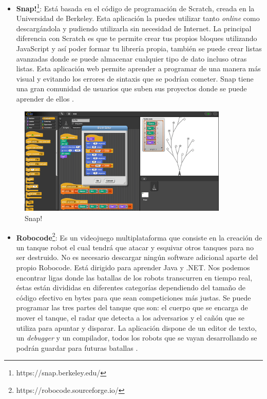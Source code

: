 \begin{itemize}
\item \textbf{Snap!}\footnote{https://snap.berkeley.edu/}: Está basada en el código de programación de Scratch, creada en la Universidad de Berkeley. Esta aplicación la puedes utilizar tanto \textit{online} como descargándola y pudiendo utilizarla sin necesidad de Internet. La principal diferencia con Scratch es que te permite crear tus propios bloques utilizando JavaScript y así poder formar tu librería propia, también se puede crear listas avanzadas donde se puede almacenar cualquier tipo de dato incluso otras listas.  Esta aplicación web permite aprender a programar de una manera más visual y evitando los errores de sintaxis que se podrían cometer. Snap tiene una gran comunidad de usuarios que suben sus proyectos donde se puede aprender de ellos \cite{app}.
\end{itemize}

\begin{figure}[H]
    \centering
    \includegraphics[width=10cm, keepaspectratio]{img/snap.png}
    \caption{Snap!}
    \label{fig:snap}
\end{figure}

\begin{itemize}
\item \textbf{Robocode}\footnote{https://robocode.sourceforge.io/}: Es un videojuego multiplataforma que consiste en la creación de un tanque robot el cual tendrá que atacar y esquivar otros tanques para no ser destruido. No es necesario descargar ningún software adicional aparte del propio Robocode. Está dirigido para aprender Java y .NET. Nos podemos encontrar ligas donde las batallas de los robots transcurren en tiempo real, éstas están divididas en diferentes categorías dependiendo del tamaño de código efectivo en bytes para que sean competiciones más justas. Se puede programar las tres partes del tanque que son: el cuerpo que se encarga de mover el tanque, el radar que detecta a los adversarios y el cañón que se utiliza para apuntar y disparar. La aplicación dispone de un editor de texto, un \textit{debugger} y un compilador, todos los robots que se vayan desarrollando se podrán guardar para futuras batallas \cite{app}.
\end{itemize}

